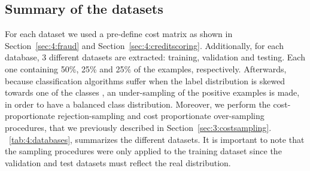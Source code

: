     
\subsection{Summary of the datasets}

For each dataset we used a pre-define cost matrix as shown in Section~\ref{sec:4:fraud} and 
Section~\ref{sec:4:creditscoring}. Additionally,  for each database, 3 different 
datasets are extracted: training, validation and testing. Each one containing 50\%, 25\% and 25\% of 
the examples, respectively. Afterwards, because classification algorithms suffer when the label 
distribution is skewed towards one of the classes \citep{Hastie2009}, an under-sampling of the 
positive examples is made, in order to have a balanced class distribution. Moreover, we perform the 
cost-proportionate rejection-sampling and cost proportionate over-sampling procedures, that we 
previously described in Section~\ref{sec:3:costsampling}. \tablename{~\ref{tab:4:databases}}, 
summarizes the different datasets. It is important to note that the sampling procedures were only 
applied to the training dataset since the validation and test datasets must reflect the real 
distribution.


